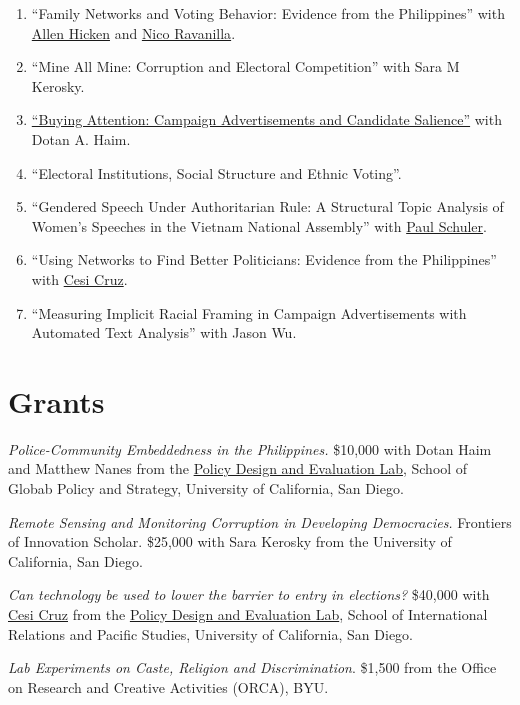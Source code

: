 \documentclass[letterpaper]{article}
\renewenvironment{itemize}{
  \begin{list}{}{
    \setlength{\leftmargin}{1.5em}
  }
}{
  \end{list}
}
\begin{document}
\begin{enumerate}
\item ``Family Networks and Voting Behavior: Evidence from the Philippines'' with \href{http://www.allenhicken.com/}{Allen Hicken} and \href{http://www.nicoravanilla.com/}{Nico Ravanilla}.

\item ``Mine All Mine: Corruption and Electoral Competition'' with Sara M Kerosky.

\item \href{http://polisci2.ucsd.edu/mwdavidson/Davidson-Haim_Buying%20Attention-Campaign%20Advertisements%20and%20Candidate%20Salience.pdf}{``Buying Attention: Campaign Advertisements and Candidate Salience''} with Dotan A. Haim.

\item ``Electoral Institutions, Social Structure and Ethnic Voting''.

\item ``Gendered Speech Under Authoritarian Rule: A Structural Topic Analysis of Women's Speeches in the Vietnam National Assembly'' with \href{http://polisci2.ucsd.edu/pschuler/}{Paul Schuler}.


\item ``Using Networks to Find Better Politicians: Evidence from the Philippines'' with \href{http://cesicruz.com/}{Cesi Cruz}.


\item ``Measuring Implicit Racial Framing in Campaign Advertisements with Automated Text Analysis'' with Jason Wu.
\end{enumerate}

\section*{Grants}
\begin{itemize}
\item \emph{Police-Community Embeddedness in the Philippines.} \$10,000 with Dotan Haim and Matthew Nanes from the \href{http://pdel.ucsd.edu/}{Policy Design and Evaluation Lab}, School of Globab Policy and Strategy, University of California, San Diego.

\item \emph{Remote Sensing and Monitoring Corruption in Developing Democracies.} Frontiers of Innovation Scholar. \$25,000 with Sara Kerosky from the University of California, San Diego. 

\item \emph{Can technology be used to lower the barrier to entry in elections?} \$40,000 with \href{http://cesicruz.com/}{Cesi Cruz} from the \href{http://pdel.ucsd.edu/}{Policy Design and Evaluation Lab}, School of International Relations and Pacific Studies, University of California, San Diego.

\item \emph{Lab Experiments on Caste, Religion and Discrimination}. \$1,500 from the Office on Research and Creative Activities (ORCA), BYU.   
\end{itemize}
\end{document}

